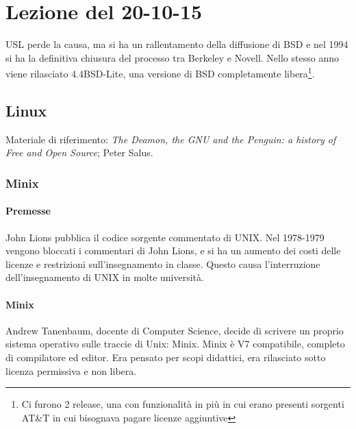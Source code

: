 \section{Lezione del 20-10-15}

USL perde la causa, ma si ha un rallentamento della diffusione di BSD e nel 1994 si ha la definitiva chiusura del processo tra Berkeley e Novell. Nello stesso anno viene rilasciato 4.4BSD-Lite, una versione di BSD completamente libera\footnote{Ci furono 2 release, una con funzionalit\`a in pi\`u in cui erano presenti sorgenti AT\&T in cui bisognava pagare licenze aggiuntive}.

\subsection{Linux}

Materiale di riferimento: \textit{The Deamon, the GNU and the Penguin: a history of Free and Open Source}; Peter Salus.

\subsubsection{Minix}

\paragraph*{Premesse} John Lions pubblica il codice sorgente commentato di UNIX. Nel 1978-1979 vengono bloccati i commentari di John Lions, e si ha un aumento dei costi delle licenze e restrizioni sull'insegnamento in classe. Questo causa l'interruzione dell'insegnamento di UNIX in molte universit\`a.

\paragraph*{Minix} Andrew Tanenbaum, docente di Computer Science, decide di scrivere un proprio sistema operativo sulle traccie di Unix: Minix. Minix \`e V7 compatibile, completo di compilatore ed editor. Era pensato per scopi didattici, era rilasciato sotto licenza permissiva e non libera.

